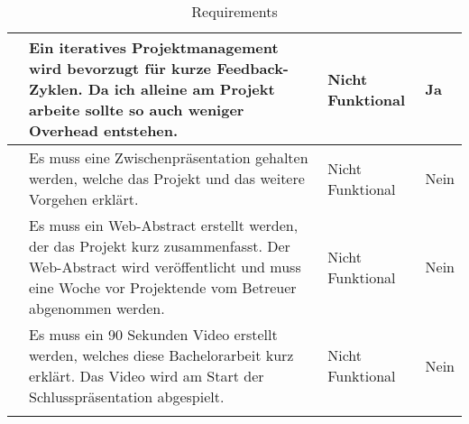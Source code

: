 \begin{longtable}{N p{8.5cm} l l}
      & Ein iteratives Projektmanagement wird bevorzugt für kurze Feedback-Zyklen. Da ich alleine am Projekt arbeite sollte so auch weniger Overhead entstehen. & Nicht Funktional & Ja \\ \midrule
      & Es muss eine Zwischenpräsentation gehalten werden, welche das Projekt und das weitere Vorgehen erklärt.
                & Nicht Funktional & Nein \\ \midrule
      & Es muss ein Web-Abstract erstellt werden, der das Projekt kurz zusammenfasst. Der Web-Abstract wird veröffentlicht und muss eine Woche vor Projektende vom Betreuer abgenommen werden.
                & Nicht Funktional & Nein \\ \midrule
      & Es muss ein 90 Sekunden Video erstellt werden, welches diese Bachelorarbeit kurz erklärt. Das Video wird am Start der Schlusspräsentation abgespielt.
                & Nicht Funktional & Nein \\ \midrule
    \bottomrule
    \caption{Requirements}\label{tab:requirements}
\end{longtable}
